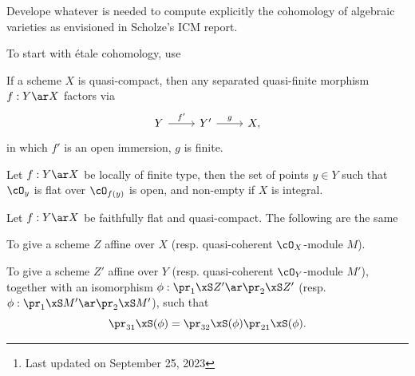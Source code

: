 \documentclass[a4paper, twoside]{article}
\title{\tbf{Cohomology of algebraic varieties}}
\author{Cong Wen, 09/2023}
\date{}
\begin{document}
\maketitle
\thispagestyle{empty}
\begin{abstract}
	This is my self-use notes\footnote{Last updated on September 25, 2023} to understand .

	Please reach out if you find anything incorrect.
\end{abstract}
\tableofcontents




 Develope whatever is needed to compute explicitly the cohomology of algebraic varieties as envisioned in Scholze's ICM report\cite{Scholze2017ICM}.



To start with {\'e}tale cohomology, use \cite{Milne1980,Huber1996,Scholze2017Diamonds}




\begin{thm}
  If a scheme $X$ is quasi-compact, then any separated quasi-finite morphism $f:Y\ar X$ factors via
  \[
    \begin{tikzcd}
      Y\ar[r, "f'"] & Y'\ar[r, "g"] & X,
    \end{tikzcd}
  \]
  in which $f'$ is an open immersion, $g$ is finite.
\end{thm}

\begin{thm}
  Let $f:Y\ar X$ be locally of finite type, then the set of points $y\in Y$ such that $\cO_{y}$ is flat over $\cO_{f(y)}$ is open, and non-empty if $X$ is integral.
\end{thm}

\begin{thm}
  Let $f:Y\ar X$ be faithfully flat and quasi-compact. The following are the same
  \begin{itm}
    \item To give a scheme $Z$ affine over $X$ (resp. quasi-coherent $\cO_{X}$-module $M$).
    \item To give a scheme $Z'$ affine over $Y$ (resp. quasi-coherent $\cO_{Y}$-module $M'$), together with an isomorphism $\phi:\pr_{1}\xS Z'\ar\pr_{2}\xS Z'$ (resp. $\phi:\pr_{1}\xS M'\ar\pr_{2}\xS M'$), such that
    \[
      \pr_{31}\xS(\phi)=\pr_{32}\xS(\phi)\pr_{21}\xS(\phi).
    \]
  \end{itm}
\end{thm}
\end{document}
